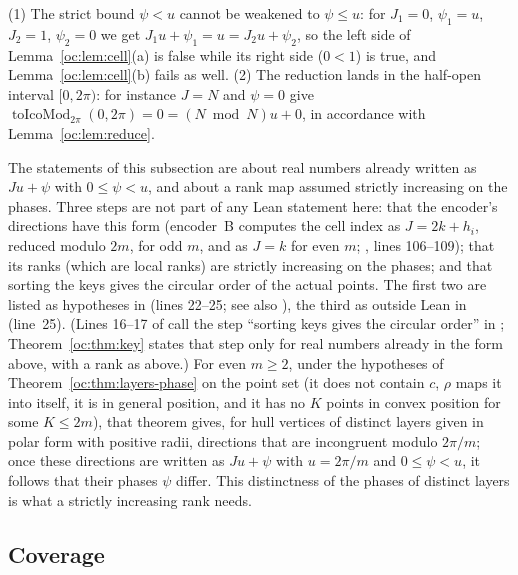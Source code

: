 \begin{remark}\label{oc:rem:halfopen}
(1) The strict bound $\psi<u$ cannot be weakened to $\psi\le u$: for $J_1=0$, $\psi_1=u$, $J_2=1$,
$\psi_2=0$ we get $J_1u+\psi_1=u=J_2u+\psi_2$, so the left side of Lemma~\ref{oc:lem:cell}(a) is false
while its right side ($0<1$) is true, and Lemma~\ref{oc:lem:cell}(b) fails as well.
(2) The reduction lands in the half-open interval $[0,2\pi)$: for instance $J=N$ and $\psi=0$ give
$\operatorname{toIcoMod}_{2\pi}(0,2\pi)=0=(N\bmod N)u+0$, in accordance with Lemma~\ref{oc:lem:reduce}.
\end{remark}

\begin{remark}\label{oc:rem:keys-outside}
The statements of this subsection are about real numbers already written as $Ju+\psi$ with $0\le\psi<u$,
and about a rank map assumed strictly increasing on the phases. Three steps are not part of any Lean
statement here: that the encoder's directions have this form (encoder~B computes the cell index as
$J=2k+h_i$, reduced modulo $2m$, for odd $m$, and as $J=k$ for even $m$;
, lines 106--109); that its ranks (which are local ranks) are strictly
increasing on the phases; and that sorting the keys gives the circular order of the actual points. The
first two are listed as hypotheses in  (lines 22--25; see also
), the third as outside Lean in  (line~25). (Lines
16--17 of  call  the step ``sorting keys gives the
circular order'' in ; Theorem~\ref{oc:thm:key} states that step only for real numbers
already in the form above, with a rank as above.) For even $m\ge2$, under the hypotheses of
Theorem~\ref{oc:thm:layers-phase} on the point set (it does not contain $c$, $\rho$ maps it into itself,
it is in general position, and it has no $K$ points in convex position for some $K\le2m$), that theorem
gives, for hull vertices of distinct layers given in polar form with positive radii, directions that are
incongruent modulo $2\pi/m$; once these directions are written as $Ju+\psi$ with $u=2\pi/m$ and $0\le\psi<u$, it follows
that their phases $\psi$ differ. This distinctness of the phases of distinct layers is what a strictly
increasing rank needs.
\end{remark}

\subsection{Coverage}\label{oc:sub:coverage}

